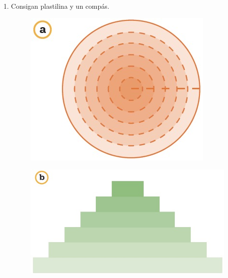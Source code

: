 \documentclass[11pt]{book}
\begin{document}
\begin{enumerate}

  \item Consigan plastilina y un compás.

        \begin{minipage}[b]{0.4\textwidth}
          \begin{figure}[H]
            \centering
            \includegraphics[width=\linewidth]{17.5.jpg}
            \label{fig:17.5}
          \end{figure}
        \end{minipage}\hfill
        \begin{minipage}[b]{0.5\textwidth}
          \begin{figure}[H]
            \centering
            \includegraphics[width=\linewidth]{17.6.jpg}
            \label{fig:17.6}
          \end{figure}
        \end{minipage}


\end{enumerate}
\end{document}
